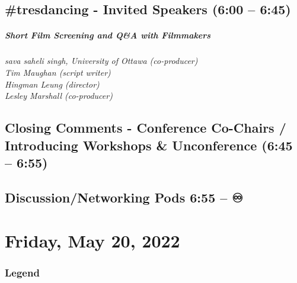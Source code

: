 \documentclass[
]{book}
\begin{document}
\hypertarget{tresdancing---invited-speakers-600-645}{%
\section*{\#tresdancing - Invited Speakers (6:00 -- 6:45)}\label{tresdancing---invited-speakers-600-645}}

\begin{wp}
\hypertarget{short-film-screening-and-qa-with-filmmakers}{%
\paragraph{Short Film Screening and Q\&A with
Filmmakers}\label{short-film-screening-and-qa-with-filmmakers}}

\emph{sava saheli singh, University of Ottawa (co-producer)}\\
\emph{Tim Maughan (script writer)}\\
\emph{Hingman Leung (director)}\\
\emph{Lesley Marshall (co-producer)}
\end{wp}

\hypertarget{closing-comments---conference-co-chairs-introducing-workshops-unconference-645-655}{%
\section*{Closing Comments - Conference Co-Chairs / Introducing Workshops \& Unconference (6:45 -- 6:55)}\label{closing-comments---conference-co-chairs-introducing-workshops-unconference-645-655}}

\hypertarget{discussionnetworking-pods-655}{%
\section*{Discussion/Networking Pods 6:55 -- ♾️}\label{discussionnetworking-pods-655}}

\hypertarget{friday-may-20-2022}{%
\chapter{Friday, May 20, 2022}\label{friday-may-20-2022}}

\hypertarget{legend-4}{%
\subsection*{Legend}\label{legend-4}}
\end{document}
